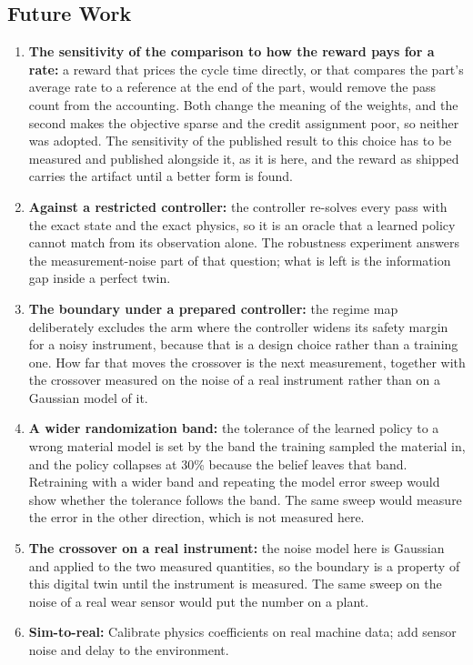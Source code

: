 \documentclass[11pt,a4paper]{article}
\begin{document}
\subsection{Future Work}
\begin{enumerate}
    \item \textbf{The sensitivity of the comparison to how the reward pays for a rate:} a reward that prices the cycle time directly, or that compares the part's average rate to a reference at the end of the part, would remove the pass count from the accounting. Both change the meaning of the weights, and the second makes the objective sparse and the credit assignment poor, so neither was adopted. The sensitivity of the published result to this choice has to be measured and published alongside it, as it is here, and the reward as shipped carries the artifact until a better form is found.
    \item \textbf{Against a restricted controller:} the controller re-solves every pass with the exact state and the exact physics, so it is an oracle that a learned policy cannot match from its observation alone. The robustness experiment answers the measurement-noise part of that question; what is left is the information gap inside a perfect twin.
    \item \textbf{The boundary under a prepared controller:} the regime map deliberately excludes the arm where the controller widens its safety margin for a noisy instrument, because that is a design choice rather than a training one. How far that moves the crossover is the next measurement, together with the crossover measured on the noise of a real instrument rather than on a Gaussian model of it.
    \item \textbf{A wider randomization band:} the tolerance of the learned policy to a wrong material model is set by the band the training sampled the material in, and the policy collapses at 30\% because the belief leaves that band. Retraining with a wider band and repeating the model error sweep would show whether the tolerance follows the band. The same sweep would measure the error in the other direction, which is not measured here.
    \item \textbf{The crossover on a real instrument:} the noise model here is Gaussian and applied to the two measured quantities, so the boundary is a property of this digital twin until the instrument is measured. The same sweep on the noise of a real wear sensor would put the number on a plant.
    \item \textbf{Sim-to-real:} Calibrate physics coefficients on real machine data; add sensor noise and delay to the environment.

\end{enumerate}
\end{document}
